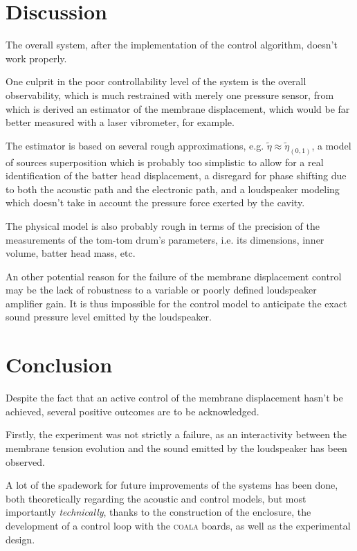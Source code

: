 \documentclass[11pt, twocolumn]{article}
\begin{document}
\section{Discussion}

The overall system, after the implementation of the control algorithm, doesn't work properly.
 
One culprit in the poor controllability level of the system is the overall observability, which is much restrained with merely one pressure sensor, from which is derived an estimator of the membrane displacement, which would be far better measured with a laser vibrometer, for example.

The estimator is based on several rough approximations, e.g. $\tilde\eta \approx \tilde\eta_{(0,1)}$, a model of sources superposition which is probably too simplistic to allow for a real identification of the batter head displacement, a disregard for phase shifting due to both the acoustic path and the electronic path, and a loudspeaker modeling which doesn't take in account the pressure force exerted by the cavity.

The physical model is also probably rough in terms of the precision of the measurements of the tom-tom drum's parameters, i.e. its dimensions, inner volume, batter head mass, etc.

An other potential reason for the failure of the membrane displacement control may be the lack of robustness to a variable or poorly defined loudspeaker amplifier gain. It is thus impossible for the control model to anticipate the exact sound pressure level emitted by the loudspeaker.

\section{Conclusion}

Despite the fact that an active control of the membrane displacement hasn't be achieved, several positive outcomes are to be acknowledged.

Firstly, the experiment was not strictly a failure, as an interactivity between the membrane tension evolution and the sound emitted by the loudspeaker has been observed. 

A lot of the spadework for future improvements of the systems has been done, both theoretically regarding the acoustic and control models, but most importantly \textit{technically}, thanks to the construction of the enclosure, the development of a control loop with the \textsc{coala} boards, as well as the experimental design.
\end{document}
